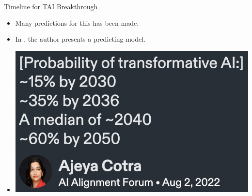 \documentclass[10pt]{beamer}
\begin{document}
\begin{frame}{Timeline for TAI Breakthrough}
  \begin{itemize}[<+- | alert@+>]
  \item Many predictions for this has been made. 
  \item In \citet{Ajeya}, the author presents a predicting model.
  \item \includegraphics[scale=0.2]{images/prediction.png}
  \end{itemize}

\end{frame}
\end{document}
